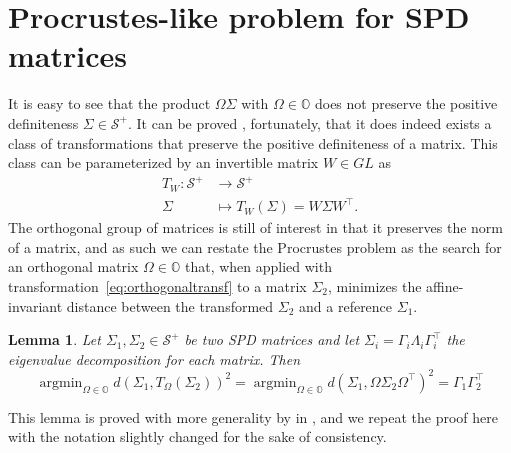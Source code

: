 \documentclass[fleqn]{article}
\theoremstyle{theorem}
\newtheorem{lemma}{Lemma}[section]
\theoremstyle{definition}
\DeclareMathOperator*{\argmin}{argmin}
\begin{document}
    \section{Procrustes-like problem for  SPD matrices}
    It is easy to see that the product $\Omega\Sigma$ with $\Omega\in\mathbb{O}$ does not preserve the positive definiteness $\Sigma\in\mathcal{S}^+$. It can be proved \cite{tuan_positive_2010}, fortunately, that it does indeed exists a class of transformations that preserve the positive definiteness of a matrix. This class can be parameterized by an invertible matrix $W\in GL$ as
    \begin{align}\label{eq:orthogonaltransf}
        T_W\colon \mathcal{S}^+ &\to \mathcal{S}^+\\
        \Sigma &\mapsto T_W(\Sigma) = W\Sigma W^\top.\nonumber
    \end{align}
    The orthogonal group of matrices is still of interest in that it preserves the norm of a matrix, and as such we can restate the Procrustes problem as the search for an orthogonal matrix $\Omega\in\mathbb{O}$ that, when applied with transformation~\eqref{eq:orthogonaltransf} to a matrix $\Sigma_2$, minimizes the affine-invariant distance between the transformed $\Sigma_2$ and a reference $\Sigma_1$.

    \begin{lemma}\label{thm:procr-spd}
        Let $\Sigma_1,\Sigma_2\in\mathcal{S}^+$ be two SPD matrices and let $\Sigma_i=\Gamma_i\Lambda_i\Gamma_i^\top$ the eigenvalue decomposition for each matrix. Then
        \begin{equation}\label{eq:procr-spd}
            \argmin_{\Omega\in\mathbb{O}}d\left(\Sigma_1, T_\Omega(\Sigma_2)\right)^2 = \argmin_{\Omega\in\mathbb{O}}d(\Sigma_1, \Omega\Sigma_2\Omega^\top)^2 = \Gamma_1\Gamma_2^\top
        \end{equation}
    \end{lemma}
    \noindent This lemma is proved with more generality by \citeauthor{bhatia_procrustes_2019} in \cite{bhatia_procrustes_2019}, and we repeat the proof here with the notation slightly changed for the sake of consistency.
\end{document}
